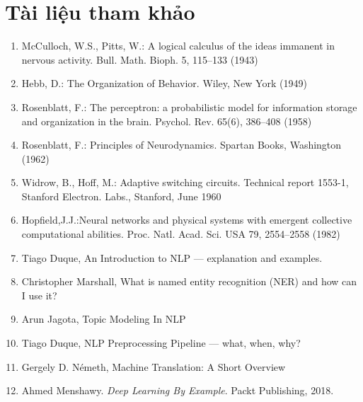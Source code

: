 

\chapter{Tài liệu tham khảo}
\begin{enumerate}
\item \label{refer:1} McCulloch, W.S., Pitts, W.: A logical calculus of the ideas immanent in nervous activity. Bull. Math. Bioph. 5, 115–133 (1943)
\item \label{refer:2} Hebb, D.: The Organization of Behavior. Wiley, New York (1949)
\item \label{refer:3} Rosenblatt, F.: The perceptron: a probabilistic model for information storage and organization in the brain. Psychol. Rev. 65(6), 386–408 (1958)
\item \label{refer:4} Rosenblatt, F.: Principles of Neurodynamics. Spartan Books, Washington (1962)
\item \label{refer:5} Widrow, B., Hoff, M.: Adaptive switching circuits. Technical report 1553-1, Stanford Electron. Labs., Stanford, June 1960
\item \label{refer:6} Hopfield,J.J.:Neural networks and physical systems with emergent collective computational abilities. Proc. Natl. Acad. Sci. USA 79, 2554–2558 (1982)
\item \label{refer:7} Tiago Duque, An Introduction to NLP — explanation and examples.
\item \label{refer:8} Christopher Marshall, What is named entity recognition (NER) and how can I use it?
\item \label{refer:9} Arun Jagota, Topic Modeling In NLP
\item \label{refer:10} Tiago Duque, NLP Preprocessing Pipeline — what, when, why?
\item \label{refer:11} Gergely D. Németh, Machine Translation: A Short Overview
\item \label{refer:12} Ahmed Menshawy. \textit{Deep Learning By Example}. Packt Publishing, 2018.

\end{enumerate}
